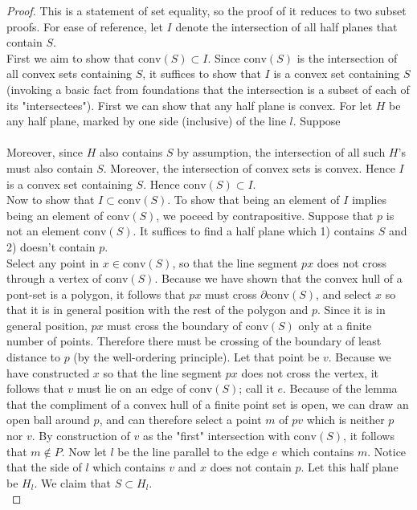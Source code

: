\documentclass[12pt]{article}
\newcommand{\conv}[1]{\mbox{conv}(#1)}
\newcommand{\bndry}{\partial}
\theoremstyle{definition}
\begin{document}
\begin{proof}
This is a statement of set equality, so the proof of it reduces to two subset proofs. For ease of reference, let $I$ denote the intersection of all half planes that contain $S$. \\

First we aim to show that $\conv{S}\subset I$. Since $\conv{S}$ is the intersection of all convex sets containing $S$, it suffices to show that $I$ is a convex set containing $S$ (invoking a basic fact from foundations that the intersection is a subset of each of its "intersectees"). First we can show that any half plane is convex. For let $H$ be any half plane, marked by one side (inclusive) of the line $l$. Suppose \\
\\
Moreover, since $H$ also contains $S$ by assumption, the intersection of all such $H$'s must also contain $S$. Moreover, the intersection of convex sets is convex. Hence $I$ is a convex set containing $S$. Hence $\conv{S}\subset I$.\\

Now to show that $I\subset \conv{S}$. To show that being an element of $I$ implies being an element of $\conv{S}$, we poceed by contrapositive. Suppose that $p$ is not an element $\conv{S}$. It suffices to find a half plane which 1) contains $S$ and 2) doesn't contain $p$. \\

Select any point in $x\in \conv{S}$, so that the line segment $px$ does not cross through a vertex of $\conv{S}$. Because we have shown that the convex hull of a pont-set is a polygon, it follows that $px$ must cross $\bndry\conv{S}$, and select $x$ so that it is in general position with the rest of the polygon and $p$. Since it is in general position, $px$ must cross the boundary of $\conv{S}$ only at a finite number of points. Therefore there must be crossing of the boundary of least distance to $p$ (by the well-ordering principle). Let that point be $v$. Because we have constructed $x$ so that the line segment $px$ does not cross the vertex, it follows that $v$ must lie on an edge of $\conv{S}$; call it $e$. Because of the lemma that the compliment of a convex hull of a finite point set is open, we can draw an open ball around $p$, and can therefore select a point $m$ of $pv$ which is neither $p$ nor $v$. By construction of $v$ as the "first" intersection with $\conv{S}$, it follows that $m\not\in P$. Now let $l$ be the line parallel to the edge $e$ which contains $m$. Notice that the side of $l$ which contains $v$ and $x$ does not contain $p$. Let this half plane be $H_l$. We claim that $S\subset H_l$. \\


\end{proof}
\end{document}
